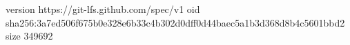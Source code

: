 version https://git-lfs.github.com/spec/v1
oid sha256:3a7ed506f675b0e328e6b33c4b302d0dff0d44baec5a1b3d368d8b4c5601bbd2
size 349692
